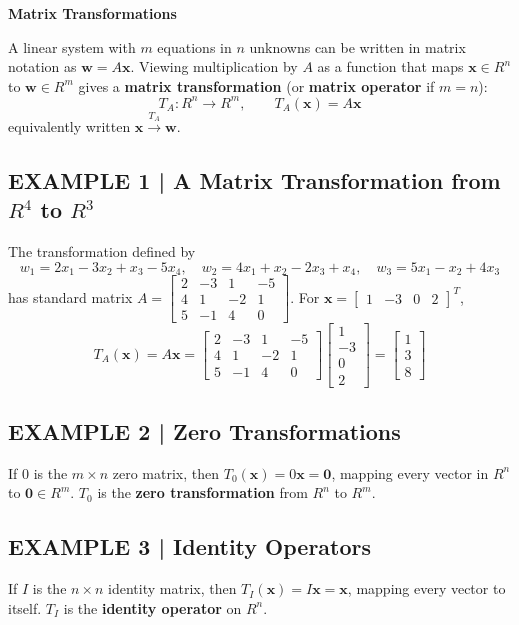 \documentclass{article}
\newcommand{\redheading}[1]{{\vspace{2mm}\noindent\Large\bfseries\color{red!55!black} #1\par}\vspace{2mm}}
\theoremstyle{mystyle}
\begin{document}
\redheading{Matrix Transformations}

A linear system with $m$ equations in $n$ unknowns can be written in matrix notation as $\mathbf{w}=A\mathbf{x}$. Viewing multiplication by $A$ as a function that maps $\mathbf{x}\in R^n$ to $\mathbf{w}\in R^m$ gives a \textbf{matrix transformation} (or \textbf{matrix operator} if $m=n$):
\[
T_A:R^n\to R^m,\qquad T_A(\mathbf{x})=A\mathbf{x}
\]
equivalently written $\mathbf{x}\xrightarrow{T_A}\mathbf{w}$.

\subsection*{EXAMPLE 1 | A Matrix Transformation from $R^4$ to $R^3$}
The transformation defined by
\[
w_1=2x_1-3x_2+x_3-5x_4,\quad
w_2=4x_1+x_2-2x_3+x_4,\quad
w_3=5x_1-x_2+4x_3
\]
has standard matrix $A=\begin{bmatrix}2&-3&1&-5\\4&1&-2&1\\5&-1&4&0\end{bmatrix}$. For $\mathbf{x}=\begin{bmatrix}1&-3&0&2\end{bmatrix}^T$,
\[
T_A(\mathbf{x})=A\mathbf{x}=\begin{bmatrix}2&-3&1&-5\\4&1&-2&1\\5&-1&4&0\end{bmatrix}\begin{bmatrix}1\\-3\\0\\2\end{bmatrix}=\begin{bmatrix}1\\3\\8\end{bmatrix}
\]

\subsection*{EXAMPLE 2 | Zero Transformations}
If $0$ is the $m\times n$ zero matrix, then $T_0(\mathbf{x})=0\mathbf{x}=\mathbf{0}$, mapping every vector in $R^n$ to $\mathbf{0}\in R^m$. $T_0$ is the \textbf{zero transformation} from $R^n$ to $R^m$.

\subsection*{EXAMPLE 3 | Identity Operators}
If $I$ is the $n\times n$ identity matrix, then $T_I(\mathbf{x})=I\mathbf{x}=\mathbf{x}$, mapping every vector to itself. $T_I$ is the \textbf{identity operator} on $R^n$.
\end{document}
